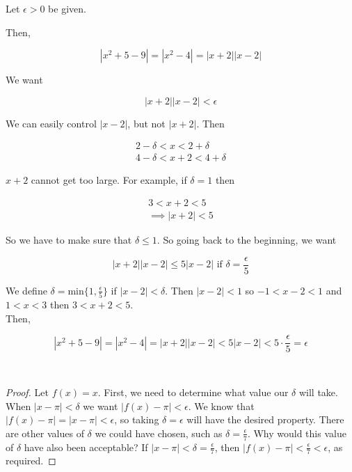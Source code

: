        Let $\epsilon > 0$ be given.

        Then,

        \[
            |x^2 + 5 - 9| = |x^2 - 4| = |x+2||x-2|
        \]

        We want

        \[
            |x+2||x-2| < \epsilon
        \]

        We can easily control $|x-2|$, but not $|x+2|$. Then

        \begin{align*}
            2 - \delta < x < 2 + \delta \\
            4 - \delta < x + 2 < 4 + \delta
        \end{align*}

        $x+2$ cannot get too large. For example, if $\delta = 1$ then

        \begin{align*}
            3 < x + 2 < 5 \\
            \implies |x+2| < 5
        \end{align*}

        So we have to make sure that $\delta \leq 1$. So going back to the beginning, we want

        \[
            |x+ 2| |x-2| \leq 5|x-2| \text{ if } \delta = \frac{\epsilon}{5}
        \]

        We define $\delta = \text{min}\{1, \frac{\epsilon}{5}\}$ if $|x-2|<\delta$. Then $|x-2| < 1$ so $-1<x-2<1$ and $1<x<3$ then $3<x+2<5$. \\

        Then,

        \[
            |x^2 + 5 - 9| = |x^2 - 4| = |x+2||x-2| < 5 |x-2| < 5 \cdot \frac{\epsilon}{5} = \epsilon
        \]

         \\

        \begin{proof}
            Let $f(x)=x$. First, we need to determine what value our $\delta$ will take. When $|x-\pi| < \delta$ we want $|f(x)-\pi|<\epsilon$. We know that $|f(x)-\pi|=|x-\pi| < \epsilon$, so taking $\delta = \epsilon$ will
            have the desired property. There are other values of $\delta$ we could have chosen, such as $\delta = \frac{\epsilon}{7}$. Why would this value of $\delta$ have also been acceptable? If
            $|x-\pi|<\delta=\frac{\epsilon}{7}$, then $|f(x)-\pi|<\frac{\epsilon}{7}<\epsilon$, as required.
        \end{proof}

